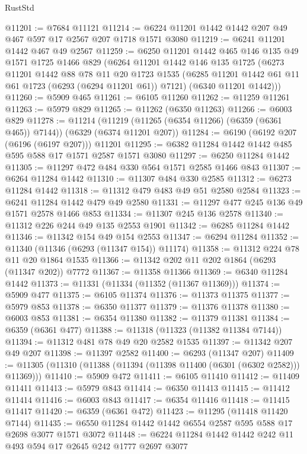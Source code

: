 \begin{lexlean}{RustStd}
\begin{coremodule}
{\begin{coremodule}
{{{{{{{{{{{{{{{{{{{{{{{{{{{{{{{{{{{@11201 := @7684 @11121
@11214 := @6224 @11201 @1442 @1442 @207 @49 @467 @597 @17 @2567 @207 @1718 @1571 @3080
@11219 := @6241 @11201 @1442 @467 @49 @2567
@11259 := @6250
    @11201
    @1442
    @465
    @146
    @135
    @49
    @1571
    @1725
    @1466
    @829
    (@6264
      @11201
      @1442
      @146
      @135
      @1725
      (@6273
        @11201
        @1442
        @88
        @78
        @11
        @20
        @1723
        @1535
        (@6285 @11201 @1442 @61 @11 @61 @1723 (@6293 (@6294 @11201 @61)) @7121)
        (@6340 @11201 @1442)))
@11260 := @5909 @465
@11261 := @6105 @11260
@11262 := @11259 @11261
@11263 := @5979 @829
@11265 := @11262 (@6350 @11263)
@11266 := @6003 @829
@11278 := @11214
    (@11219 (@11265 (@6354 @11266) (@6359 (@6361 @465)) @7144))
    (@6329 (@6374 @11201 @207))
@11284 := @6190 (@6192 @207 (@6196 (@6197 @207))) @11201
@11295 := @6382 @11284 @1442 @1442 @485 @595 @588 @17 @1571 @2587 @1571 @3080
@11297 := @6250 @11284 @1442
@11305 := @11297 @472 @484 @330 @564 @1571 @2585 @1466 @843
@11307 := @6264 @11284 @1442
@11310 := @11307 @484 @330 @2585
@11312 := @6273 @11284 @1442
@11318 := @11312 @479 @483 @49 @51 @2580 @2584
@11323 := @6241 @11284 @1442 @479 @49 @2580
@11331 := @11297 @477 @245 @136 @49 @1571 @2578 @1466 @853
@11334 := @11307 @245 @136 @2578
@11340 := @11312 @226 @244 @49 @135 @2553 @1901
@11342 := @6285 @11284 @1442
@11346 := @11342 @154 @49 @154 @2553
@11347 := @6294 @11284
@11352 := @11340 (@11346 (@6293 (@11347 @154)) @11174)
@11358 := @11312 @224 @78 @11 @20 @1864 @1535
@11366 := @11342 @202 @11 @202 @1864 (@6293 (@11347 @202)) @7772
@11367 := @11358 @11366
@11369 := @6340 @11284 @1442
@11373 := @11331 (@11334 (@11352 (@11367 @11369)))
@11374 := @5909 @477
@11375 := @6105 @11374
@11376 := @11373 @11375
@11377 := @5979 @853
@11378 := @6350 @11377
@11379 := @11376 @11378
@11380 := @6003 @853
@11381 := @6354 @11380
@11382 := @11379 @11381
@11384 := @6359 (@6361 @477)
@11388 := @11318 (@11323 (@11382 @11384 @7144))
@11394 := @11312 @481 @78 @49 @20 @2582 @1535
@11397 := @11342 @207 @49 @207
@11398 := @11397 @2582
@11400 := @6293 (@11347 @207)
@11409 := @11305 (@11310 (@11388 (@11394 (@11398 @11400 (@6301 (@6302 @2582))) @11369)))
@11410 := @5909 @472
@11411 := @6105 @11410
@11412 := @11409 @11411
@11413 := @5979 @843
@11414 := @6350 @11413
@11415 := @11412 @11414
@11416 := @6003 @843
@11417 := @6354 @11416
@11418 := @11415 @11417
@11420 := @6359 (@6361 @472)
@11423 := @11295 (@11418 @11420 @7144)
@11435 := @6550 @11284 @1442 @1442 @6554 @2587 @595 @588 @17 @2698 @3077 @1571 @3072
@11448 := @6224 @11284 @1442 @1442 @242 @11 @493 @594 @17 @2645 @242 @1777 @2697 @3077
}}}}}}}}}}}}}}}}}}}}}}}}}}}}}}}}}}}
\end{coremodule}}
\end{coremodule}
\end{lexlean}
